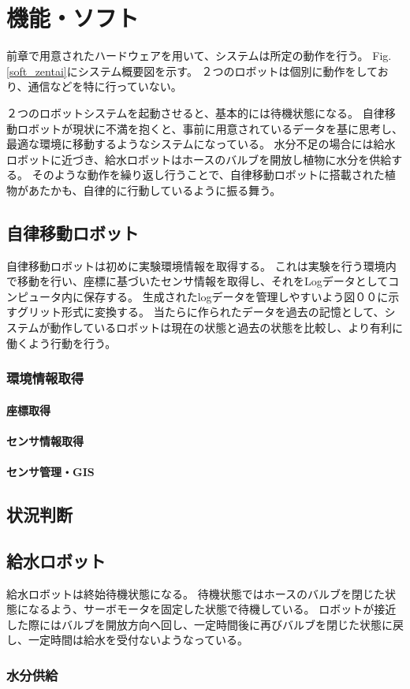 \chapter{機能・ソフト}
前章で用意されたハードウェアを用いて、システムは所定の動作を行う。
Fig.\ref{soft_zentai}にシステム概要図を示す。
２つのロボットは個別に動作をしており、通信などを特に行っていない。
\par ２つのロボットシステムを起動させると、基本的には待機状態になる。
自律移動ロボットが現状に不満を抱くと、事前に用意されているデータを基に思考し、最適な環境に移動するようなシステムになっている。
水分不足の場合には給水ロボットに近づき、給水ロボットはホースのバルブを開放し植物に水分を供給する。
そのような動作を繰り返し行うことで、自律移動ロボットに搭載された植物があたかも、自律的に行動しているように振る舞う。

\section{自律移動ロボット}
自律移動ロボットは初めに実験環境情報を取得する。
これは実験を行う環境内で移動を行い、座標に基づいたセンサ情報を取得し、それをLogデータとしてコンピュータ内に保存する。
生成されたlogデータを管理しやすいよう図００に示すグリット形式に変換する。
当たらに作られたデータを過去の記憶として、システムが動作しているロボットは現在の状態と過去の状態を比較し、より有利に働くよう行動を行う。


\subsection{環境情報取得}

\subsubsection{座標取得}

\subsubsection{センサ情報取得}

\subsubsection{センサ管理・GIS}

\section{状況判断}

\section{給水ロボット}
給水ロボットは終始待機状態になる。
待機状態ではホースのバルブを閉じた状態になるよう、サーボモータを固定した状態で待機している。
ロボットが接近した際にはバルブを開放方向へ回し、一定時間後に再びバルブを閉じた状態に戻し、一定時間は給水を受付ないようなっている。
\subsection{水分供給}

